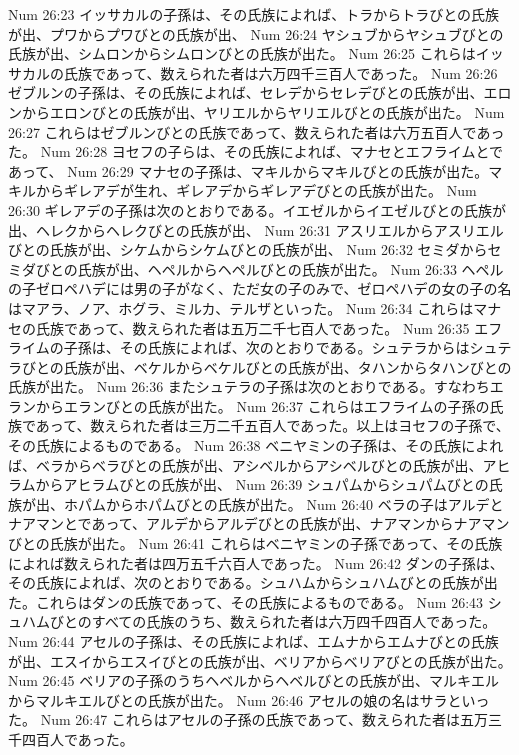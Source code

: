 Num 26:23  イッサカルの子孫は、その氏族によれば、トラからトラびとの氏族が出、プワからプワびとの氏族が出、
Num 26:24  ヤシュブからヤシュブびとの氏族が出、シムロンからシムロンびとの氏族が出た。
Num 26:25  これらはイッサカルの氏族であって、数えられた者は六万四千三百人であった。
Num 26:26  ゼブルンの子孫は、その氏族によれば、セレデからセレデびとの氏族が出、エロンからエロンびとの氏族が出、ヤリエルからヤリエルびとの氏族が出た。
Num 26:27  これらはゼブルンびとの氏族であって、数えられた者は六万五百人であった。
Num 26:28  ヨセフの子らは、その氏族によれば、マナセとエフライムとであって、
Num 26:29  マナセの子孫は、マキルからマキルびとの氏族が出た。マキルからギレアデが生れ、ギレアデからギレアデびとの氏族が出た。
Num 26:30  ギレアデの子孫は次のとおりである。イエゼルからイエゼルびとの氏族が出、ヘレクからヘレクびとの氏族が出、
Num 26:31  アスリエルからアスリエルびとの氏族が出、シケムからシケムびとの氏族が出、
Num 26:32  セミダからセミダびとの氏族が出、ヘペルからヘペルびとの氏族が出た。
Num 26:33  ヘペルの子ゼロペハデには男の子がなく、ただ女の子のみで、ゼロペハデの女の子の名はマアラ、ノア、ホグラ、ミルカ、テルザといった。
Num 26:34  これらはマナセの氏族であって、数えられた者は五万二千七百人であった。
Num 26:35  エフライムの子孫は、その氏族によれば、次のとおりである。シュテラからはシュテラびとの氏族が出、ベケルからベケルびとの氏族が出、タハンからタハンびとの氏族が出た。
Num 26:36  またシュテラの子孫は次のとおりである。すなわちエランからエランびとの氏族が出た。
Num 26:37  これらはエフライムの子孫の氏族であって、数えられた者は三万二千五百人であった。以上はヨセフの子孫で、その氏族によるものである。
Num 26:38  ベニヤミンの子孫は、その氏族によれば、ベラからベラびとの氏族が出、アシベルからアシベルびとの氏族が出、アヒラムからアヒラムびとの氏族が出、
Num 26:39  シュパムからシュパムびとの氏族が出、ホパムからホパムびとの氏族が出た。
Num 26:40  ベラの子はアルデとナアマンとであって、アルデからアルデびとの氏族が出、ナアマンからナアマンびとの氏族が出た。
Num 26:41  これらはベニヤミンの子孫であって、その氏族によれば数えられた者は四万五千六百人であった。
Num 26:42  ダンの子孫は、その氏族によれば、次のとおりである。シュハムからシュハムびとの氏族が出た。これらはダンの氏族であって、その氏族によるものである。
Num 26:43  シュハムびとのすべての氏族のうち、数えられた者は六万四千四百人であった。
Num 26:44  アセルの子孫は、その氏族によれば、エムナからエムナびとの氏族が出、エスイからエスイびとの氏族が出、ベリアからベリアびとの氏族が出た。
Num 26:45  ベリアの子孫のうちヘベルからヘベルびとの氏族が出、マルキエルからマルキエルびとの氏族が出た。
Num 26:46  アセルの娘の名はサラといった。
Num 26:47  これらはアセルの子孫の氏族であって、数えられた者は五万三千四百人であった。
